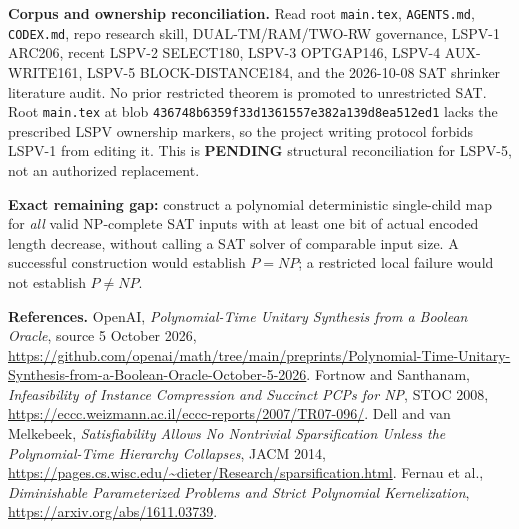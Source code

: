 \documentclass[11pt]{article}
\begin{document}
\noindent\textbf{Corpus and ownership reconciliation.} Read root \texttt{main.tex}, \texttt{AGENTS.md}, \texttt{CODEX.md}, repo research skill, DUAL-TM/RAM/TWO-RW governance, LSPV-1 ARC206, recent LSPV-2 SELECT180, LSPV-3 OPTGAP146, LSPV-4 AUX-WRITE161, LSPV-5 BLOCK-DISTANCE184, and the 2026-10-08 SAT shrinker literature audit. No prior restricted theorem is promoted to unrestricted SAT. Root \texttt{main.tex} at blob \texttt{436748b6359f33d1361557e382a139d8ea512ed1} lacks the prescribed LSPV ownership markers, so the project writing protocol forbids LSPV-1 from editing it. This is \textbf{PENDING} structural reconciliation for LSPV-5, not an authorized replacement.

\noindent\textbf{Exact remaining gap:} construct a polynomial deterministic single-child map for \emph{all} valid NP-complete SAT inputs with at least one bit of actual encoded length decrease, without calling a SAT solver of comparable input size. A successful construction would establish $P=NP$; a restricted local failure would not establish $P\ne NP$.

\noindent\textbf{References.} OpenAI, \emph{Polynomial-Time Unitary Synthesis from a Boolean Oracle}, source 5 October 2026,
\url{https://github.com/openai/math/tree/main/preprints/Polynomial-Time-Unitary-Synthesis-from-a-Boolean-Oracle-October-5-2026}.
Fortnow and Santhanam, \emph{Infeasibility of Instance Compression and Succinct PCPs for NP}, STOC 2008, \url{https://eccc.weizmann.ac.il/eccc-reports/2007/TR07-096/}.
Dell and van Melkebeek, \emph{Satisfiability Allows No Nontrivial Sparsification Unless the Polynomial-Time Hierarchy Collapses}, JACM 2014, \url{https://pages.cs.wisc.edu/~dieter/Research/sparsification.html}.
Fernau et al., \emph{Diminishable Parameterized Problems and Strict Polynomial Kernelization}, \url{https://arxiv.org/abs/1611.03739}.
\end{document}
